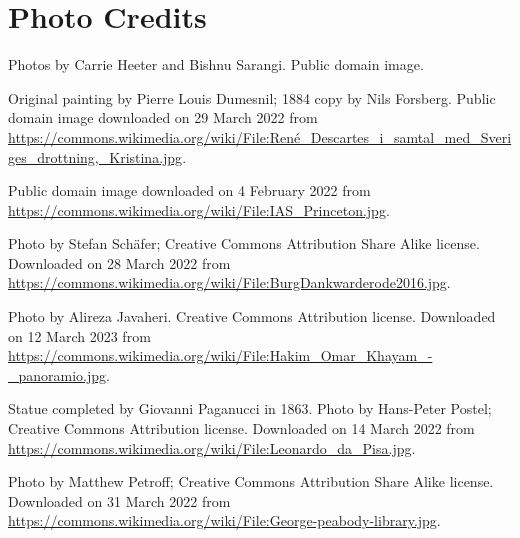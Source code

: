 
\clearpage

\setcounter{secnumdepth}{-1}


\chapter{Photo Credits}


\begin{Itemize} \raggedright

 Photos by Carrie Heeter and Bishnu Sarangi. Public domain image.

 Original painting by Pierre Louis Dumesnil; 1884 copy by Nils Forsberg. Public domain image downloaded on 29 March 2022 from\\[-2bp]
{\scriptsizer\url{https://commons.wikimedia.org/wiki/File:René\_Descartes\_i\_samtal\_med\_Sveriges\_drottning,\_Kristina.jpg}}.

 Public domain image downloaded on 4 February 2022 from \url{https://commons.wikimedia.org/wiki/File:IAS\_Princeton.jpg}.

 Photo by Stefan Schäfer; Creative Commons Attribution Share Alike license. Downloaded on 28 March 2022 from
\url{https://commons.wikimedia.org/wiki/File:BurgDankwarderode2016.jpg}.

 Photo by Alireza Javaheri. Creative Commons Attribution license. Downloaded on 12 March 2023 from\\
{\small\url{https://commons.wikimedia.org/wiki/File:Hakim\_Omar\_Khayam\_-\_panoramio.jpg}}.

 Statue completed by Giovanni Paganucci in 1863. Photo by Hans-Peter Postel; Creative Commons Attribution license. Downloaded on 14 March 2022 from\\
\url{https://commons.wikimedia.org/wiki/File:Leonardo\_da\_Pisa.jpg}.

 Photo by Matthew Petroff; Creative Commons Attribution Share Alike license. Downloaded on 31 March 2022 from
\url{https://commons.wikimedia.org/wiki/File:George-peabody-library.jpg}.



\end{Itemize}
